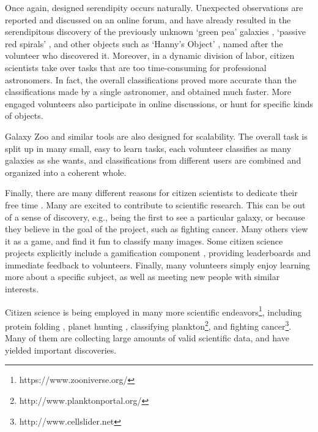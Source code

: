 \documentclass{acmproc-sp}
\begin{document}
Once again, designed serendipity occurs naturally. Unexpected observations are reported and discussed on an online forum, and have already resulted in the serendipitous discovery of the previously unknown `green pea' galaxies \cite{cardamone2009galaxy}, `passive red spirals' \cite{masters2010galaxy}, and other objects such as `Hanny's Object' \cite{lintott2009galaxy}, named after the volunteer who discovered it. Moreover, in a dynamic division of labor, citizen scientists take over tasks that are too time-consuming for professional astronomers. In fact, the overall classifications proved more accurate than the classifications made by a single astronomer, and obtained much faster. More engaged volunteers also participate in online discussions, or hunt for specific kinds of objects.

Galaxy Zoo and similar tools are also designed for scalability. The overall task is split up in many small, easy to learn tasks, each volunteer classifies as many galaxies as she wants, and classifications from different users are combined and organized into a coherent whole.

Finally, there are many different reasons for citizen scientists to dedicate their free time \cite{raddick2010galaxy}. Many are excited to contribute to scientific research. This can be out of a sense of discovery, e.g., being the first to see a particular galaxy, or because they believe in the goal of the project, such as fighting cancer. Many others view it as a game, and find it fun to classify many images. Some citizen science projects explicitly include a gamification component \cite{cooper2010predicting}, providing leaderboards and immediate feedback to volunteers. Finally, many volunteers simply enjoy learning more about a specific subject, as well as meeting new people with similar interests.

Citizen science is being employed in many more scientific endeavors\footnote{https://www.zooniverse.org/}, including 
protein folding \cite{cooper2010predicting}, planet hunting \cite{schwamb2012planet}, classifying plankton\footnote{http://www.planktonportal.org/}, and fighting cancer\footnote{http://www.cellslider.net}. Many of them are collecting large amounts of valid scientific data, and have yielded important discoveries.
 
\end{document}
